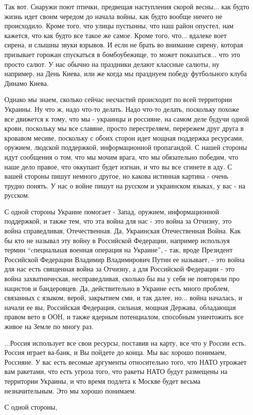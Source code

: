 Так вот. Снаружи поют птички, предвещая наступления скорой весны... как будто
жизнь идет своим чередом до начала войны, как будто вообще ничего не
происходило. Кроме того, что улицы пустынны, что наш район опустел, нам
кажется, что как будто все такое же самое. Кроме того, что... вдалеке воет
сирена, и слышны звуки взрывов.  И если не брать во внимание сирену, которая
призывает горожан спускаться в бомбоубежище, то может показаться... что это
просто салют. У нас обычно на праздники делают классные салюты, ну например, на
День Киева, или же когда мы празднуем победу футбольного клуба Динамо Киева.

Однако мы знаем, сколько сейчас несчастий происходит по всей территории
Украины. Ну что ж, надо что-то делать. Надо что-то делать, поскольку похоже все
движется к тому, что мы - украинцы и россияне, на самом деле будучи одной
крови, поскольку мы все славяне, просто перестреляем, перережем друг друга в
кровавом месиве, поскольку с обоих сторон идет мощная поддержка ресурсами,
оружием, людской поддержкой, информационной пропагандой. С нашей стороны идут
сообщения о том, что мы мочим врага, что мы обязательно победим, что наше дело
правое, что оккупант будет изгнан, и что вы все сгинете в аду. С вашей стороны
пишут немного другое, но какова истинная картина - очень трудно понять.  У нас
о войне пишут на русском и украинском языках, у вас - на русском.

С одной стороны Украине помогает - Запад, оружием, информационной поддержкой, и
также тем, что эта война для нас - это война за Отчизну, это война
справедливая, Отечественная. Да, Украинская Отечественная Война. Как бы кто не
называл эту войну в Российской Федерации, например используя термин
\enquote{cпециальная военная операция на Украине}, - так, вроде Президент
Российской Федерации Владимир Владимирович Путин ее называет, - это война для
нас есть священная война за Отчизну, а для Российской Федерации - это война
захватническая, несправедливая, сколько бы вы у себя не повторяли про нацистов
и бандеровцев. Да, действительно в Украине есть много проблем, связанных с
языком, верой, закрытием сми, и так далее, но... война началась, и начали ее
вы, Российская Федерация, сильная, мощная Держава, обладающая правом вето в
ООН, и также ядерным потенциалом, способным уничтожить все живое на Земле по
многу раз.

...Россия использует все свои ресурсы, поставив на карту, все что у России
есть. Россия играет ва-банк, и Вы пойдете до конца. Мы вас хорошо понимаем,
Россияне. У вас есть весомые аргументы относительно того, что НАТО угрожает вам
ракетами, что есть угроза того, что ракеты НАТО будут размещены на территории
Украины, и что время подлета к Москве будет весьма незначительным. Это мы
хорошо понимаем. 

С одной стороны,
